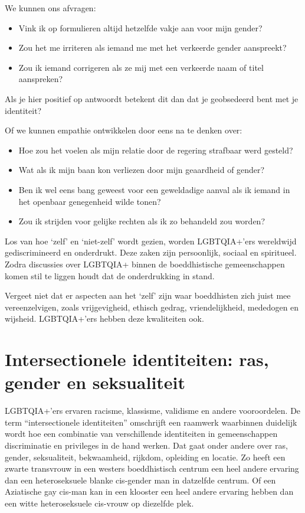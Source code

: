 \documentclass[12pt,openany]{book}
\begin{document}
We kunnen ons afvragen:

\begin{itemize}
\setlength\itemsep{0em}
\item Vink ik op formulieren altijd hetzelfde vakje aan voor mijn gender?
\item Zou het me irriteren als iemand me met het verkeerde gender aanspreekt?
\item Zou ik iemand corrigeren als ze mij met een verkeerde naam of titel aanspreken?
\end{itemize}

Als je hier positief op antwoordt betekent dit dan dat je geobsedeerd bent met je identiteit?

Of we kunnen empathie ontwikkelen door eens na te denken over:

\begin{itemize}
\setlength\itemsep{0em}
\item Hoe zou het voelen als mijn relatie door de regering strafbaar werd gesteld?
\item Wat als ik mijn baan kon verliezen door mijn geaardheid of gender?
\item Ben ik wel eens bang geweest voor een geweldadige aanval als ik iemand in het openbaar genegenheid wilde tonen?
\item Zou ik strijden voor gelijke rechten als ik zo behandeld zou worden?
\end{itemize}

Los van hoe ‘zelf’ en ‘niet-zelf’ wordt gezien, worden LGBTQIA+’ers wereldwijd gediscrimineerd en onderdrukt. Deze zaken zijn persoonlijk, sociaal en spiritueel. Zodra discussies over LGBTQIA+ binnen de boeddhistische gemeenschappen komen stil te liggen houdt dat de onderdrukking in stand.

Vergeet niet dat er aspecten aan het ‘zelf’ zijn waar boeddhisten zich juist mee vereenzelvigen, zoals vrijgevigheid, ethisch gedrag, vriendelijkheid, mededogen en wijsheid. LGBTQIA+’ers hebben deze kwaliteiten ook.

\section*{Intersectionele identiteiten: ras, gender en seksualiteit}

LGBTQIA+’ers ervaren racisme, klassisme, validisme en andere vooroordelen. De term “intersectionele identiteiten” omschrijft een raamwerk waarbinnen duidelijk wordt hoe een combinatie van verschillende identiteiten in gemeenschappen discriminatie en privileges in de hand werken. Dat gaat onder andere over ras, gender, seksualiteit, bekwaamheid, rijkdom, opleiding en locatie. Zo heeft een zwarte transvrouw in een westers boeddhistisch centrum een heel andere ervaring dan een heteroseksuele blanke cis-gender man in datzelfde centrum. Of een Aziatische gay cis-man kan in een klooster een heel andere ervaring hebben dan een witte heteroseksuele cis-vrouw op diezelfde plek.
\end{document}
